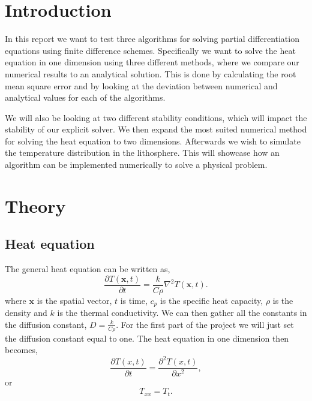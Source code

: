 \documentclass{article}
\begin{document}
\begin{multicols}{2}

\section{Introduction}

In this report we want to test three algorithms for solving partial differentiation equations using finite difference schemes. Specifically we want to solve the heat equation in one dimension using three different methods, where we compare our numerical results to an analytical solution. This is done by calculating the root mean square error and by looking at the deviation between numerical and analytical values for each of the algorithms. 

We will also be looking at two different stability conditions, which will impact the stability of our explicit solver. We then expand the most suited numerical method for solving the heat equation to two dimensions. Afterwards we wish to simulate the temperature distribution in the lithosphere. This will showcase how an algorithm can be implemented numerically to solve a physical problem. 

\section{Theory}

\subsection{Heat equation}

The general heat equation can be written as,
\begin{equation}
	\frac{\partial T(\textbf{x}, t)}{\partial t} = \frac{k}{C\rho}\nabla^2 T(\textbf{x}, t). \label{eq:gen_heat}
\end{equation}
where $\textbf{x}$ is the spatial vector, $t$ is time, $c_p$ is the specific heat capacity, $\rho$ is the density and $k$ is the thermal conductivity. We can then gather all the constants in the diffusion constant, $D=\frac{k}{C\rho}$. For the first part of the project we will just set the diffusion constant equal to one. The heat equation in one dimension then becomes, 
\begin{equation}
	\frac{\partial T(x,t)}{\partial t} = \frac{\partial^2 T(x,t)}{\partial x^2}, \label{eq:heat_one}
\end{equation}
or 
\begin{equation}
	T_{xx}=T_t.
\end{equation}

\end{multicols}
\end{document}
